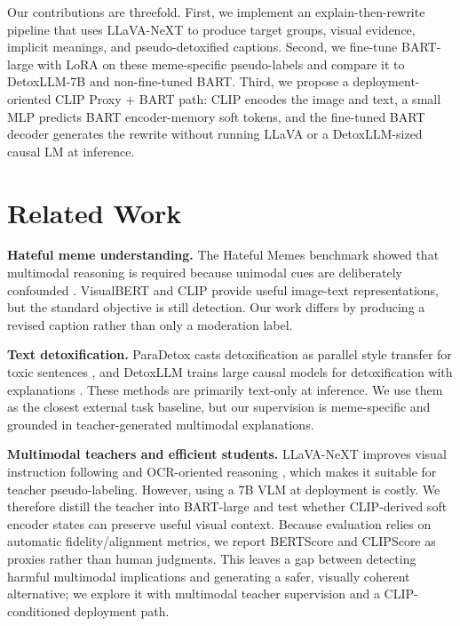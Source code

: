 \documentclass{article}
\begin{document}
Our contributions are threefold. First, we implement an explain-then-rewrite
pipeline that uses LLaVA-NeXT \cite{liu2024llavanext} to produce target groups,
visual evidence, implicit meanings, and pseudo-detoxified captions. Second, we
fine-tune BART-large \cite{lewis2020bart} with LoRA \cite{hu2022lora} on these
meme-specific pseudo-labels and compare it to DetoxLLM-7B
\cite{khondaker2024detoxllm} and non-fine-tuned BART. Third, we propose a
deployment-oriented CLIP Proxy + BART path: CLIP \cite{radford2021learning}
encodes the image and text, a small MLP predicts BART encoder-memory soft
tokens, and the fine-tuned BART decoder generates the rewrite without running
LLaVA or a DetoxLLM-sized causal LM at inference.

\section{Related Work}
\label{sec:related}

\textbf{Hateful meme understanding.} The Hateful Memes benchmark showed that
multimodal reasoning is required because unimodal cues are deliberately
confounded \cite{kiela2020hateful}. VisualBERT \cite{li2019visualbert} and CLIP
\cite{radford2021learning} provide useful image-text representations, but the
standard objective is still detection. Our work differs by producing a revised
caption rather than only a moderation label.

\textbf{Text detoxification.} ParaDetox casts detoxification as parallel style
transfer for toxic sentences \cite{logacheva2022paradetox}, and DetoxLLM trains
large causal models for detoxification with explanations
\cite{khondaker2024detoxllm}. These methods are primarily text-only at
inference. We use them as the closest external task baseline, but our
supervision is meme-specific and grounded in teacher-generated multimodal
explanations.

\textbf{Multimodal teachers and efficient students.} LLaVA-NeXT improves visual
instruction following and OCR-oriented reasoning \cite{liu2024llavanext}, which
makes it suitable for teacher pseudo-labeling. However, using a 7B VLM at
deployment is costly. We therefore distill the teacher into BART-large and test
whether CLIP-derived soft encoder states can preserve useful visual context.
Because evaluation relies on automatic fidelity/alignment metrics, we report
BERTScore \cite{zhang2020bertscore} and CLIPScore
\cite{hessel2021clipscore} as proxies rather than human judgments. This leaves a
gap between detecting harmful multimodal implications and generating a safer,
visually coherent alternative; we explore it with multimodal teacher supervision
and a CLIP-conditioned deployment path.
\end{document}
